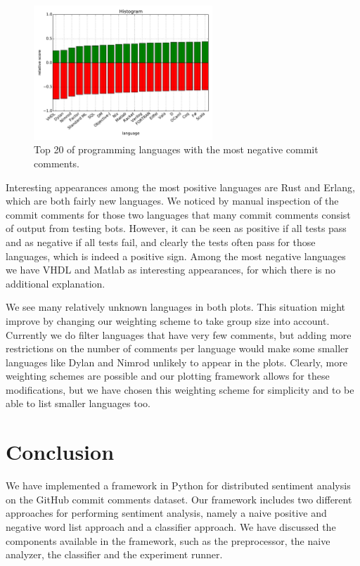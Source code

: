 \documentclass{article}
\begin{document}
\begin{figure}[h!]
  \centering
  \includegraphics[width=0.6\textwidth]{Images/Negative_languages_passive_aggressive.pdf}
  \caption{Top 20 of programming languages with the most negative commit comments.}\label{fig:language-neg}
\end{figure}

Interesting appearances among the most positive languages are Rust and
Erlang, which are both fairly new languages. We noticed by manual inspection
of the commit comments for those two languages that many commit comments
consist of output from testing bots. However, it can be seen as positive
if all tests pass and as negative if all tests fail, and clearly the tests
often pass for those languages, which is indeed a positive sign. Among the
most negative languages we have VHDL and Matlab as interesting appearances,
for which there is no additional explanation.

We see many relatively unknown languages in both plots. This situation might
improve by changing our weighting scheme to take group size into account.
Currently we do filter languages that have very few comments, but adding more
restrictions on the number of comments per language would make some smaller
languages like Dylan and Nimrod unlikely to appear in the plots. Clearly,
more weighting schemes are possible and our plotting framework allows for
these modifications, but we have chosen this weighting scheme for simplicity
and to be able to list smaller languages too.

\section{Conclusion}\label{sec:conclusion}
We have implemented a framework in Python for distributed sentiment analysis on
the GitHub commit comments dataset. Our framework includes two different
approaches for performing sentiment analysis, namely a naive positive and
negative word list approach and a classifier approach. We have discussed the
components available in the framework, such as the preprocessor, the naive
analyzer, the classifier and the experiment runner.
\end{document}
